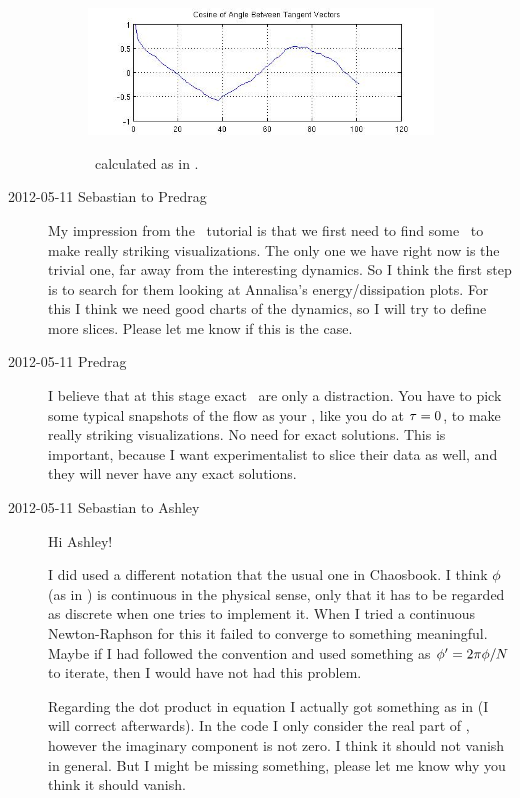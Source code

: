 \begin{description}
\begin{figure}
  \includegraphics[width=0.9\textwidth]{chartBorder1}\\
  \caption{\ChartBord\ calculated as in . }
  \label{f:chartBorder1}
\end{figure}

\item[2012-05-11 Sebastian to Predrag]
My impression from the \statesp\ tutorial is that we first need to find
some \reqva\ to make really striking visualizations. The only
one we have right now is the trivial one, far away from the interesting
dynamics. So I think the first step is to search for them looking at
Annalisa's energy/dissipation plots. For this I think we need good charts
of the dynamics, so I will try to define more slices. Please let me know
if this is the case.

\item[2012-05-11 Predrag] I believe that at this stage exact \reqva\ are
only a distraction. You have to pick some typical snapshots of the flow
as your \templates, like you do at $\tau=0$, to make really striking
visualizations. No need for exact solutions. This is important, because I
want experimentalist to slice their data as well, and they will never
have any exact solutions.

\item[2012-05-11 Sebastian to Ashley]
Hi Ashley!

I did used a different notation that the usual one in Chaosbook. I think
${\bf \phi}$ (as in ) is continuous in the physical sense, only
that it has to be regarded as discrete when one tries to implement it.
When I tried a continuous Newton-Raphson for this it failed to converge
to something meaningful. Maybe if I had followed the convention and used
something as ${\bf \phi}' = 2 \pi {\bf \phi}/N$ to iterate, then I would have
not had this problem.

Regarding the dot product in equation  I actually got
something as in  (I will correct  afterwards).
In the code I only consider the real part of , however the
imaginary component is not zero. I think it should not vanish in general.
But I might be missing something, please let me know why you think it
should vanish.


\end{description}

